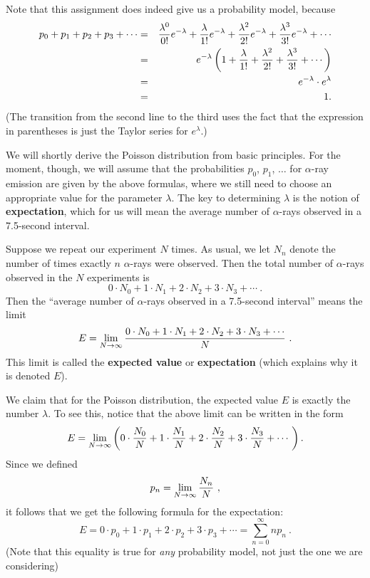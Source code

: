 {{{{        Note that this assignment does indeed give us a probability model, because
\begin{eqnarray*}
p_0 + p_1 + p_2  +p_3 + \cdots &=&
{\lambda^0\over 0!}e^{-\lambda}+{\lambda\over 1!} e^{-\lambda} + 
{\lambda ^2\over 2!}e^{-\lambda} + {\lambda ^3\over 3!}e^{-\lambda} 
+\cdots \\
& =& e^{-\lambda}\left( 1 + {\lambda\over 1!} + {\lambda ^2\over 2!} 
+ {\lambda ^3\over 3!} + \cdots \right) \\
& = & e^{-\lambda}\cdot e^{\lambda}\\
& = & 1. 
\end{eqnarray*}
(The transition from the second line to the third uses the fact that the expression in parentheses is just the Taylor series for $e^{\lambda}$.)

We will shortly derive the Poisson distribution from basic principles.  For the moment, though, we will assume that the probabilities $p_0$, $p_1$, $\ldots$ for $\alpha$-ray emission are given by the above formulas, where we still need to choose an appropriate value for the parameter $\lambda$.  The key to determining $\lambda$ is the notion of {\bf expectation}, which for us will mean the average number of $\alpha$-rays observed in a 7.5-second interval.

        Suppose we repeat our experiment $N$ times.  As usual, we let $N_n$ denote the number of times exactly $n$ $\alpha$-rays were observed.  Then the total number of $\alpha$-rays observed in the $N$ experiments is 
\[0\cdot N_0 + 1\cdot N_1 + 2\cdot N_2 + 3\cdot N_3 + \cdots\ .\]
Then the ``average number of $\alpha$-rays observed in a 7.5-second interval'' means the limit
\[E = \lim_{N\to\infty}{{0\cdot N_0 + 1\cdot N_1 + 2\cdot N_2 + 3\cdot N_3
        + \cdots}\over N}\ .\]
This limit is called the {\bf expected value} or {\bf expectation} (which explains why it is denoted $E$).

        We claim that for the Poisson distribution, the expected value $E$ is exactly the number $\lambda$.  To see this, notice that the above limit can be written in the form
\[
E = \lim_{N\to\infty} \left( 0\cdot {N_0\over N} + 1\cdot {N_1\over N} +
        2\cdot {N_2\over N} + 3\cdot {N_3\over N} + \cdots\ \right).
\]
Since we defined
\[p_n = \lim_{N\to\infty} {N_n\over N}\ ,\]
it follows 
that we get the following formula for the expectation:
\[E = 0\cdot p_0 + 1\cdot p_1 + 2\cdot p_2 + 3\cdot p_3 + \cdots =
        \sum_{n=0}^\infty np_n\ .\]
(Note that this equality is true for {\em any} probability model, not just the one we are considering)

}}}}
